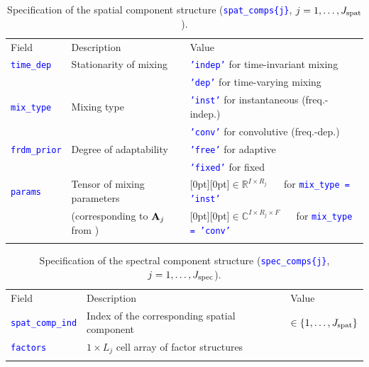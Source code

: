 \documentclass{article}
\newcommand{\matlabcolor}{blue}
\newcommand{\matvar}[1]{\textcolor{\matlabcolor}{\tt {#1}}}
\begin{document}
\begin{table}[t]
  \begin{center}
   \begin{tabular}{l|l|l}
      Field & Description & Value \\
      \hhline{===}
       \matvar{time\_dep} & Stationarity of mixing & \matvar{'indep'} for time-invariant mixing \\
      \hhline{~~-}
                       &                             & \matvar{'dep'} for time-varying mixing \\
      \hhline{---}
       \matvar{mix\_type} & Mixing type & \matvar{'inst'} for instantaneous (freq.-indep.) \\
      \hhline{~~-}
                       &             & \matvar{'conv'} for convolutive (freq.-dep.) \\
      \hhline{---}
       \matvar{frdm\_prior} & Degree of adaptability & \matvar{'free'} for adaptive \\
      \hhline{~~-}
                         &                        & \matvar{'fixed'} for fixed  \\
      \hhline{---}
       \matvar{params} & Tensor of mixing parameters & \raisebox{-1.5pt}[0pt][0pt]{$\in \mathbb R^{I \times R_j}$} $\quad$ for \matvar{mix\_type = 'inst'}\\
      \hhline{~~-}
                    & (corresponding to ${\bf A}_j$ from \cite{Ozerov2010a}) & \raisebox{-1.5pt}[0pt][0pt]{$\in \mathbb C^{I \times R_j \times F}$} $\quad$ for \matvar{mix\_type = 'conv'} \\
      \hhline{===}
    \end{tabular}
    \caption{Specification of the spatial component structure (\matvar{spat\_comps\{j\}}, $j = 1, \ldots, J_{\rm spat}$).}
    \label{Tab_Spat_Comp}
  \end{center}
\end{table}

\begin{table}[t]
  \begin{center}
   \begin{tabular}{l|l|l}
      Field & Description & Value \\
      \hhline{===}
       \matvar{spat\_comp\_ind} & Index of the corresponding spatial component &  $\in \{1, \ldots, J_{\rm spat} \}$ \\
      \hhline{---}
       \matvar{factors} & $1 \times L_j$ cell array of factor structures & \\
      \hhline{===}
    \end{tabular}
    \caption{Specification of the spectral component structure (\matvar{spec\_comps\{j\}}, $j = 1, \ldots, J_{\rm spec}$).}
    \label{Tab_Spec_Comp}
  \end{center}
\end{table}
\end{document}
